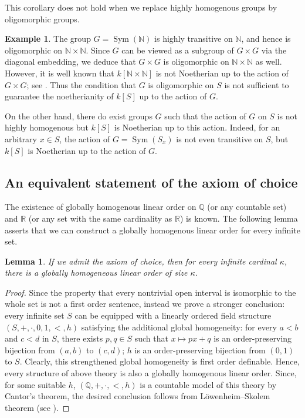 \documentclass[11pt, reqno]{amsart}
\theoremstyle{plain}
\newtheorem{lemma}[theorem]{Lemma}
\numberwithin{equation}{section}
\theoremstyle{definition}
\newtheorem{example}[theorem]{Example}
\DeclareMathOperator{\Sym}{Sym}
\begin{document}
This corollary does not hold when we replace highly homogenous groups by oligomorphic groups.

\begin{example} \label{example}
The group $G = \Sym(\mathbb{N})$ is highly transitive on $\mathbb{N}$, and hence is oligomorphic on $\mathbb{N} \times \mathbb{N}$. Since $G$ can be viewed as a subgroup of $G \times G$ via the diagonal embedding, we deduce that $G \times G$ is oligomorphic on $\mathbb{N} \times \mathbb{N}$ as well. However, it is well known that $k[\mathbb{N} \times \mathbb{N}]$ is not Noetherian up to the action of $G \times G$; see \cite[Example 3.8]{HS}. Thus the condition that $G$ is oligomorphic on $S$ is not sufficient to guarantee the noetherianity of $k[S]$ up to the action of $G$.

On the other hand, there do exist groups $G$ such that the action of $G$ on $S$ is not highly homogenous but $k[S]$ is Noetherian up to this action. Indeed, for an arbitrary $x \in S$, the action of $G = \Sym(S_x)$ is not even transitive on $S$, but $k[S]$ is Noetherian up to the action of $G$.
\end{example}


\subsection{An equivalent statement of the axiom of choice}

The existence of globally homogenous linear order on $\mathbb{Q}$ (or any countable set) and $\mathbb{R}$ (or any set with the same cardinality as $\mathbb{R}$) is known. The following lemma asserts that we can construct a globally homogenous linear order for every infinite set.

\begin{lemma} \label{key lemma}
If we admit the axiom of choice, then for every infinite cardinal $\kappa$, there is a globally homogeneous linear order of size $\kappa$.
\end{lemma}

\begin{proof}
Since the property that every nontrivial open interval is isomorphic to the whole set is not a first order sentence, instead we prove a stronger conclusion: every infinite set $S$ can be equipped with a linearly ordered field structure $(S, +, \cdot, 0, 1, <, h)$ satisfying the additional global homogeneity: for every $a < b$ and $c < d$ in $S$, there exists $p, q \in S$ such that $x \mapsto px+q$ is an order-preserving bijection from $(a, b)$ to $(c, d)$; $h$ is an order-preserving bijection from $(0, 1)$ to $S$. Clearly, this strengthened global homogeneity is first order definable. Hence, every structure of above theory is also a globally homogenous linear order. Since, for some suitable $h$, $(\mathbb{Q}, +, \cdot, <, h)$ is a countable model of this theory by Cantor's theorem, the desired conclusion follows from L\"{o}wenheim–Skolem theorem (see \cite[Section 2.3]{Marker}).
\end{proof}
\end{document}
